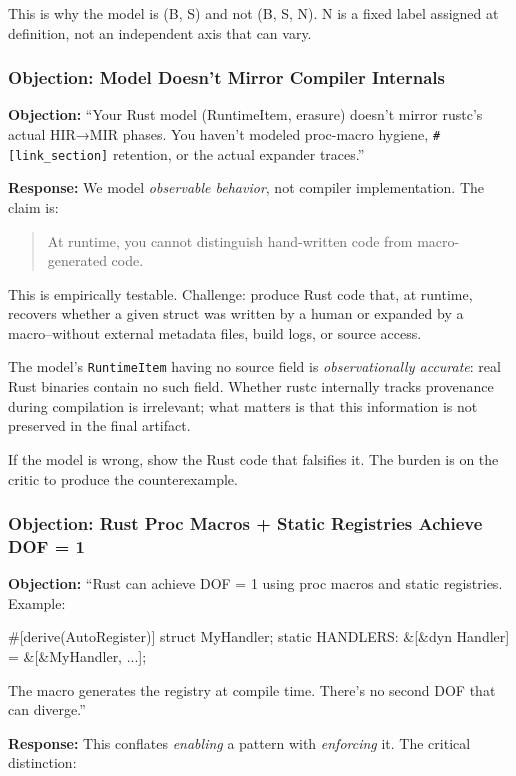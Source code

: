 This is why the model is (B, S) and not (B, S, N). N is a fixed label assigned at definition, not an independent axis that can vary.

\subsubsection{Objection: Model Doesn't Mirror Compiler Internals}

\textbf{Objection:} ``Your Rust model (RuntimeItem, erasure) doesn't mirror rustc's actual HIR→MIR phases. You haven't modeled proc-macro hygiene, \texttt{\#[link\_section]} retention, or the actual expander traces.''

\textbf{Response:} We model \emph{observable behavior}, not compiler implementation. The claim is:

\begin{quote}
At runtime, you cannot distinguish hand-written code from macro-generated code.
\end{quote}

This is empirically testable. Challenge: produce Rust code that, at runtime, recovers whether a given struct was written by a human or expanded by a macro--without external metadata files, build logs, or source access.

The model's \texttt{RuntimeItem} having no source field is \emph{observationally accurate}: real Rust binaries contain no such field. Whether rustc internally tracks provenance during compilation is irrelevant; what matters is that this information is not preserved in the final artifact.

If the model is wrong, show the Rust code that falsifies it. The burden is on the critic to produce the counterexample.

\subsubsection{Objection: Rust Proc Macros + Static Registries Achieve DOF = 1}

\textbf{Objection:} ``Rust can achieve DOF = 1 using proc macros and static registries. Example:
\begin{code}
#[derive(AutoRegister)]
struct MyHandler;
static HANDLERS: &[&dyn Handler] = &[&MyHandler, ...];
\end{code}
The macro generates the registry at compile time. There's no second DOF that can diverge.''

\textbf{Response:} This conflates \emph{enabling} a pattern with \emph{enforcing} it. The critical distinction:

